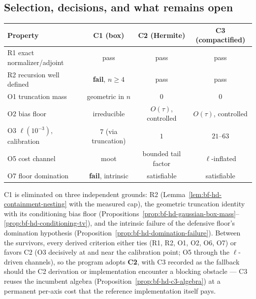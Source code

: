 \subsection{Selection, decisions, and what remains open}

\begin{center}
\begin{tabular}{lccc}
\toprule
Property & C1 (box) & C2 (Hermite) & C3 (compactified)\\
\midrule
R1 exact normalizer/adjoint & pass & pass & pass\\
R2 recursion well defined & \textbf{fail}, \(n\ge4\) & pass & pass\\
O1 truncation mass & geometric in \(n\) & \(0\) & \(0\)\\
O2 bias floor & irreducible & \(O(\tau)\), controlled & \(O(\tau)\), controlled\\
O3 \(\ell(10^{-3})\), calibration & \(7\) (via truncation) & \(1\) & \(21\)--\(63\)\\
O5 cost channel & moot & bounded tail factor & \(\ell\)-inflated\\
O7 floor domination & \textbf{fail}, intrinsic & satisfiable & satisfiable\\
\bottomrule
\end{tabular}
\end{center}

C1 is eliminated on three independent grounds: R2
(Lemma~\ref{lem:bf-hd-containment-nesting} with the measured cap), the
geometric truncation identity with its conditioning bias floor
(Propositions~\ref{prop:bf-hd-gaussian-box-mass}--%
\ref{prop:bf-hd-conditioning-tv}), and the intrinsic failure of the
defensive floor's domination hypothesis
(Proposition~\ref{prop:bf-hd-domination-failure}).  Between the
survivors, every derived criterion either ties (R1, R2, O1, O2, O6, O7)
or favors C2 (O3 decisively at and near the calibration point; O5
through the \(\ell\)-driven channels), so the program adopts \textbf{C2},
with C3 recorded as the fallback should the C2 derivation or
implementation encounter a blocking obstacle --- C3 reuses the incumbent
algebra (Proposition~\ref{prop:bf-hd-c3-algebra}) at a permanent
per-axis cost that the reference implementation itself pays.

